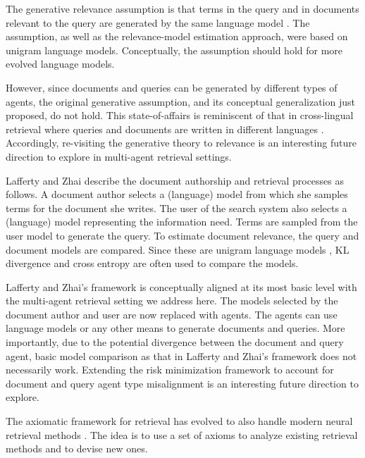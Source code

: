  The generative relevance assumption
is that terms in the query and in documents relevant to the query are
generated by the same language model \cite{Lavrenko+Croft:01a,lavrenko-rm-book}. The assumption, as well as the  relevance-model estimation approach, were based on unigram language models. Conceptually, the assumption should hold for more evolved language models.

However, since documents and queries can be generated by different types of agents, the original generative assumption, and its conceptual generalization just proposed, do not hold. This state-of-affairs is reminiscent of that in cross-lingual retrieval where queries and documents are written in different languages \cite{Lavrenko+al:02a,crossling}. Accordingly, re-visiting the generative theory to relevance is an interesting future direction to explore in multi-agent retrieval settings.



 Lafferty and Zhai
\cite{Lafferty+Zhai:01a} describe the document authorship and
retrieval processes as follows. A document author selects a (language)
model from which she samples terms for the document she writes. The
user of the search system also selects a (language) model representing
the information need. Terms are sampled from the user model to
generate the query. To estimate document relevance, the query and
document models are compared. Since these are unigram language models \cite{Lafferty+Zhai:01a}, KL divergence and cross entropy are often used to compare the models.

Lafferty and Zhai's framework \cite{Lafferty+Zhai:01a} is conceptually
aligned at its most basic level with the multi-agent retrieval setting
we address here. The models selected by the document author and user
are now replaced with agents. The agents can use language models or
any other means to generate documents and queries. More importantly, due to the potential divergence
between the document and query agent, basic model comparison as that in
Lafferty and Zhai's framework \cite{Lafferty+Zhai:01a} does not
necessarily work. Extending the risk minimization framework to account for document and query agent type misalignment is an interesting future direction to explore.


 The axiomatic framework for
retrieval \cite{Fang+Zhai:05a} has evolved to
also handle modern neural retrieval methods \cite{Cheng+Fang:20a}. The idea is to use a set of axioms to analyze existing
retrieval methods and to devise new ones.

